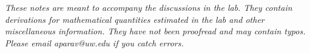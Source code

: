 \documentclass[11pt]{article}
\begin{document}
\begin{center}
  \setlength\fboxsep{0.5cm}
\end{center}

\textit{These notes are meant to accompany the discussions in the lab. They contain derivations for mathematical quantities estimated in the lab and other miscellaneous information. They have not been proofread and may contain typos. Please email aparav@uw.edu if you catch errors.}
\end{document}
